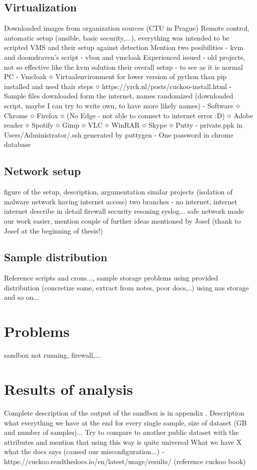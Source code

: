 \subsection{Virtualization}
Downloaded images from organization sources (CTU in Prague)
Remote control, automatic setup (ansible, basic security,...), everything was intended to be scripted
VMS and their setup against detection
Mention two posibilities
    - kvm and doomdraven's script
    - vbox and vmcloak
        Experienced issued - old projects, not so effective like the kvm solution
their overall setup - to see as it is normal PC
    - Vmcloak
    ○ Virtualenvironment for lower version of python than pip installed and used thair steps
    ○ https://yrck.nl/posts/cuckoo-install.html
    - Sample files downloaded form the internet, names randomized (downloaded script, maybe I can try to write own, to have more likely names)
    - Software
    ○ Chrome
    ○ Firefox
    ○ (No Edge - not able to connect to internet error :D)
    ○ Adobe reader
    ○ Spotify
    ○ Gimp
    ○ VLC
    ○ WinRAR
    ○ Skype
    ○ Putty
    - private.ppk in Users/Administrator/.ssh generated by puttygen
    - One password in chrome database
\subsection{Network setup}
figure of the setup, description, argumentation
similar projects (isolation of malware network having internet access)
two branches - no internet, internet
internet
    describe in detail
    firewall
    security resoning
    syslog...
safe network made our work easier, mention couple of further ideas mentioned by Josef (thank to Josef at the beginning of thesis!)
\subsection{Sample distribution}
Reference scripts and crons..., sample storage
problems using provided distribution (concretize some, extract from notes, poor docs,..)
using nas storage and so on...

\section{Problems}
sandbox not running, firewall,...

\section{Results of analysis}
Complete description of the output of the sandbox is in appendix .
Description what everything we have at the end for every single sample, size of dataset (GB and number of samples)...
Try to compare to another public dataset with the attributes and mention that using this way is quite universal
What we have X what the docs says (caused our misconfiguration...) - https://cuckoo.readthedocs.io/en/latest/usage/results/ (reference cuckoo book)

